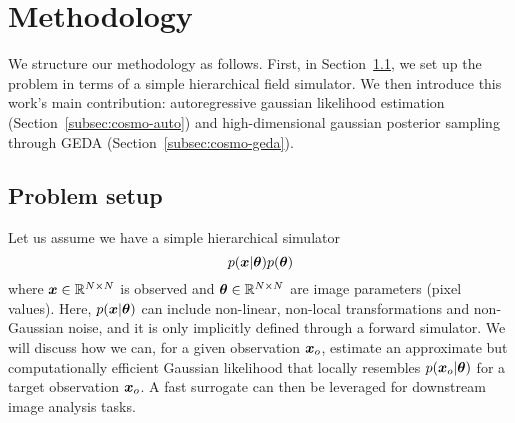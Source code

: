 \section{Methodology} \label{sec:cosmo-method}

We structure our methodology as follows. First, in Section~\ref{subsec:cosmo-setup}, we set up the problem in terms of a simple hierarchical field simulator. We then introduce this work's main contribution: autoregressive gaussian likelihood estimation (Section~\ref{subsec:cosmo-auto}) and high-dimensional gaussian posterior sampling through GEDA (Section~\ref{subsec:cosmo-geda}).


\subsection{Problem setup} \label{subsec:cosmo-setup}



Let us assume we have a simple hierarchical simulator
\begin{equation}
    p(\bm{x}| \bm{\theta})p(\bm{\theta})
\end{equation}
where $\bm{x}\in \mathbb{R}^{N \times N}$ is observed and $\bm{\theta}\in \mathbb{R}^{N \times N}$ are image parameters (pixel values). Here, $p(\bm{x}|\bm{\theta})$ can include non-linear, non-local transformations and non-Gaussian noise, and it is only implicitly defined through a forward simulator. We will discuss how we can, for a given observation $\bm{x}_o$, estimate an approximate but computationally efficient Gaussian likelihood that locally resembles $p(\bm{x}_o|\bm{\theta})$ for a target observation $\bm{x}_o$. 
A fast surrogate can then be leveraged for downstream image analysis tasks.



